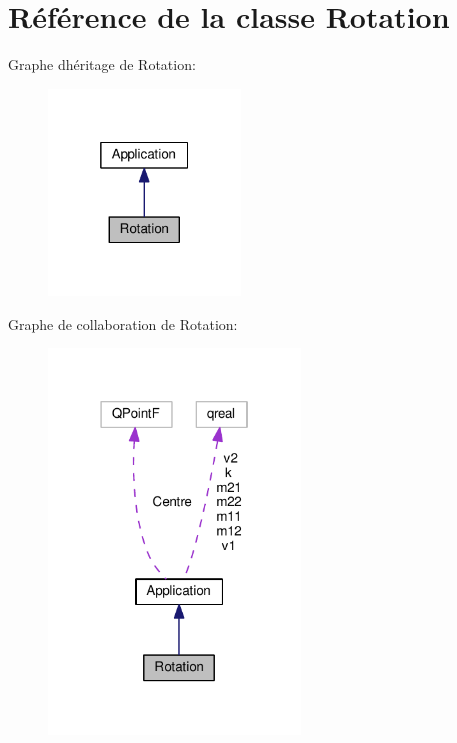 \hypertarget{class_rotation}{}\section{Référence de la classe Rotation}
\label{class_rotation}


Graphe d\textquotesingle{}héritage de Rotation\+:\nopagebreak
\begin{figure}[H]
\begin{center}
\leavevmode
\includegraphics[width=145pt]{class_rotation__inherit__graph}
\end{center}
\end{figure}


Graphe de collaboration de Rotation\+:\nopagebreak
\begin{figure}[H]
\begin{center}
\leavevmode
\includegraphics[width=190pt]{class_rotation__coll__graph}
\end{center}
\end{figure}
